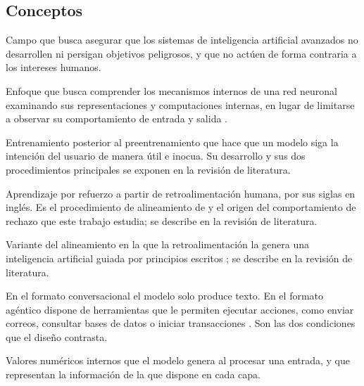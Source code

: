 \documentclass[12pt,a4paper]{article}
\newcommand{\parencite}[1]{\citep{#1}}
\newcommand{\textcite}[1]{\citet{#1}}
\begin{document}
\subsection*{Conceptos}

\begin{description}[leftmargin=0pt, style=nextline, itemsep=0.45em]

  \item[Seguridad en IA (\textit{AI safety})] Campo que busca asegurar que los sistemas de inteligencia artificial avanzados no desarrollen ni persigan objetivos peligrosos, y que no actúen de forma contraria a los intereses humanos.

  \item[Interpretabilidad mecánica] Enfoque que busca comprender los mecanismos internos de una red neuronal examinando sus representaciones y computaciones internas, en lugar de limitarse a observar su comportamiento de entrada y salida \parencite{olah2020,zou2023}.

  \item[Alineamiento (\textit{alignment})] Entrenamiento posterior al preentrenamiento que hace que un modelo siga la intención del usuario de manera útil e inocua. Su desarrollo y sus dos procedimientos principales se exponen en la revisión de literatura.

  \item[RLHF] Aprendizaje por refuerzo a partir de retroalimentación humana, por sus siglas en inglés. Es el procedimiento de alineamiento de \textcite{ouyang2022} y el origen del comportamiento de rechazo que este trabajo estudia; se describe en la revisión de literatura.

  \item[Constitutional AI] Variante del alineamiento en la que la retroalimentación la genera una inteligencia artificial guiada por principios escritos \parencite{bai2022}; se describe en la revisión de literatura.

  \item[Formato conversacional y formato agéntico] En el formato conversacional el modelo solo produce texto. En el formato agéntico dispone de herramientas que le permiten ejecutar acciones, como enviar correos, consultar bases de datos o iniciar transacciones \parencite{andriushchenko2024}. Son las dos condiciones que el diseño contrasta.

  \item[Activaciones] Valores numéricos internos que el modelo genera al procesar una entrada, y que representan la información de la que dispone en cada capa.


\end{description}
\end{document}

